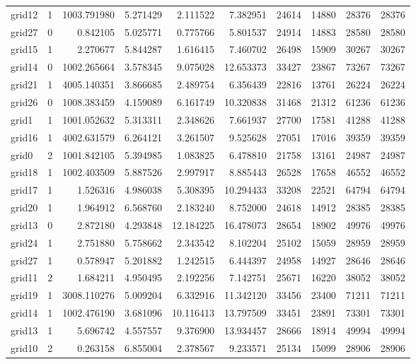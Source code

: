 \begin{longtable}{|l|r|r|r|r|r|r|r|r|r|}
grid12 & 1 & 1003.791980 & 5.271429 & 2.111522 & 7.382951 & 24614 & 14880 & 28376 & 28376 \\
grid27 & 0 & 0.842105 & 5.025771 & 0.775766 & 5.801537 & 24914 & 14883 & 28580 & 28580 \\
grid15 & 1 & 2.270677 & 5.844287 & 1.616415 & 7.460702 & 26498 & 15909 & 30267 & 30267 \\
grid14 & 0 & 1002.265664 & 3.578345 & 9.075028 & 12.653373 & 33427 & 23867 & 73267 & 73267 \\
grid21 & 1 & 4005.140351 & 3.866685 & 2.489754 & 6.356439 & 22816 & 13761 & 26224 & 26224 \\
grid26 & 0 & 1008.383459 & 4.159089 & 6.161749 & 10.320838 & 31468 & 21312 & 61236 & 61236 \\
grid1 & 1 & 1001.052632 & 5.313311 & 2.348626 & 7.661937 & 27700 & 17581 & 41288 & 41288 \\
grid16 & 1 & 4002.631579 & 6.264121 & 3.261507 & 9.525628 & 27051 & 17016 & 39359 & 39359 \\
grid0 & 2 & 1001.842105 & 5.394985 & 1.083825 & 6.478810 & 21758 & 13161 & 24987 & 24987 \\
grid18 & 1 & 1002.403509 & 5.887526 & 2.997917 & 8.885443 & 26528 & 17658 & 46552 & 46552 \\
grid17 & 1 & 1.526316 & 4.986038 & 5.308395 & 10.294433 & 33208 & 22521 & 64794 & 64794 \\
grid20 & 1 & 1.964912 & 6.568760 & 2.183240 & 8.752000 & 24618 & 14912 & 28385 & 28385 \\
grid13 & 0 & 2.872180 & 4.293848 & 12.184225 & 16.478073 & 28654 & 18902 & 49976 & 49976 \\
grid24 & 1 & 2.751880 & 5.758662 & 2.343542 & 8.102204 & 25102 & 15059 & 28959 & 28959 \\
grid27 & 1 & 0.578947 & 5.201882 & 1.242515 & 6.444397 & 24958 & 14927 & 28646 & 28646 \\
grid11 & 2 & 1.684211 & 4.950495 & 2.192256 & 7.142751 & 25671 & 16220 & 38052 & 38052 \\
grid19 & 1 & 3008.110276 & 5.009204 & 6.332916 & 11.342120 & 33456 & 23400 & 71211 & 71211 \\
grid14 & 1 & 1002.476190 & 3.681096 & 10.116413 & 13.797509 & 33451 & 23891 & 73301 & 73301 \\
grid13 & 1 & 5.696742 & 4.557557 & 9.376900 & 13.934457 & 28666 & 18914 & 49994 & 49994 \\
grid10 & 2 & 0.263158 & 6.855004 & 2.378567 & 9.233571 & 25134 & 15099 & 28906 & 28906 \\

\end{longtable}
